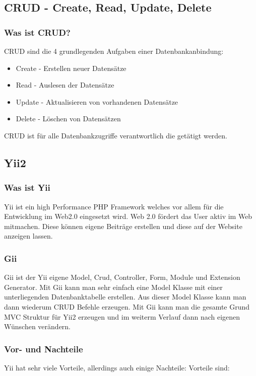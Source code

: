 \subsection{CRUD - Create, Read, Update, Delete} \label{sec:CRUD}

\subsubsection{Was ist CRUD?}
CRUD sind die 4 grundlegenden Aufgaben einer Datenbankanbindung:
\begin{itemize}
	\item Create - Erstellen neuer Datensätze
	\item Read - Auslesen der Datensätze
	\item Update - Aktualisieren von vorhandenen Datensätze
	\item Delete - Löschen von Datensätzen
\end{itemize}
\cite{CRUD}
\newline
CRUD ist für alle Datenbankzugriffe verantwortlich die getätigt werden.


\subsection{Yii2} \label{sec:YII2}

\subsubsection{Was ist Yii}
Yii ist ein high Performance PHP Framework welches vor allem für die Entwicklung im Web2.0 eingesetzt wird. Web 2.0 fördert das User aktiv im Web mitmachen. Diese können eigene Beiträge erstellen und diese auf der Website anzeigen lassen.\cite{Web_2}

\subsubsection{Gii} \label{sec:gii}
Gii ist der Yii eigene Model, Crud, Controller, Form, Module und Extension Generator. Mit Gii kann man sehr einfach eine Model Klasse mit einer unterliegenden Datenbanktabelle erstellen. Aus dieser Model Klasse kann man dann wiederum CRUD Befehle erzeugen. Mit Gii kann man die gesamte Grund MVC Struktur für Yii2 erzeugen und im weiterm Verlauf dann nach eigenen Wünschen verändern.

\subsubsection{Vor- und Nachteile}
Yii hat sehr viele Vorteile, allerdings auch einige Nachteile:
\newline
Vorteile sind:


